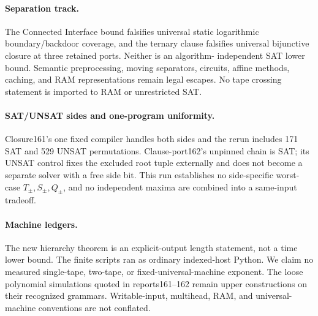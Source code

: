 \documentclass[11pt]{article}
\begin{document}
\paragraph{Separation track.}
The Connected Interface bound falsifies universal static logarithmic
boundary/backdoor coverage, and the ternary clause falsifies universal
bijunctive closure at three retained ports.  Neither is an algorithm-
independent SAT lower bound.  Semantic preprocessing, moving separators,
circuits, affine methods, caching, and RAM representations remain legal
escapes.  No tape crossing statement is imported to RAM or unrestricted SAT.

\paragraph{SAT/UNSAT sides and one-program uniformity.}
Closure161's one fixed compiler handles both sides and the rerun includes 171
SAT and 529 UNSAT permutations.  Clause-port162's unpinned chain is SAT; its
UNSAT control fixes the excluded root tuple externally and does not become a
separate solver with a free side bit.  This run establishes no side-specific
worst-case $T_\pm,S_\pm,Q_\pm$, and no independent maxima are combined into a
same-input tradeoff.

\paragraph{Machine ledgers.}
The new hierarchy theorem is an explicit-output length statement, not a time
lower bound.  The finite scripts ran as ordinary indexed-host Python.  We
claim no measured single-tape, two-tape, or fixed-universal-machine exponent.
The loose polynomial simulations quoted in reports161--162 remain upper
constructions on their recognized grammars.  Writable-input, multihead, RAM,
and universal-machine conventions are not conflated.
\end{document}
